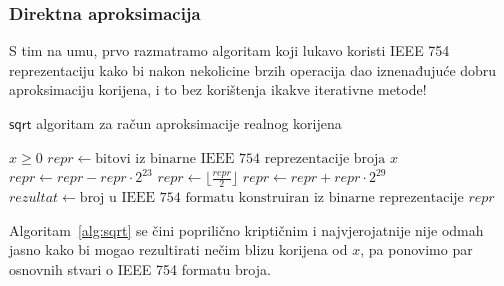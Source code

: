 \documentclass[12pt]{scrartcl}
\begin{document}
\subsubsection{Direktna aproksimacija }
S tim na umu, prvo razmatramo algoritam koji lukavo koristi IEEE 754 reprezentaciju kako bi nakon nekolicine brzih operacija dao iznenađujuće
dobru aproksimaciju korijena, i to bez korištenja ikakve iterativne metode!
\begin{algorithm}
    \caption{$\mathsf{sqrt}$ algoritam za račun aproksimacije realnog korijena~\cite{lomont}}\label{alg:sqrt}
    \begin{algorithmic}[1]
    \Require $x \geq 0$
    \State $repr \gets \text{bitovi iz binarne IEEE 754 reprezentacije broja $x$}$
    \State $repr \gets repr - repr \cdot 2^{23}$
    \State $repr \gets \lfloor\frac{repr}{2}\rfloor$
    \State $repr \gets repr + repr \cdot 2^{29}$
    \State $rezultat \gets \text{broj u IEEE 754 formatu konstruiran iz binarne reprezentacije $repr$}$
    \end{algorithmic}
\end{algorithm}
Algoritam~\ref{alg:sqrt} se čini poprilično kriptičnim i najvjerojatnije nije odmah jasno kako bi mogao rezultirati nečim blizu korijena od $x$, pa
ponovimo par osnovnih stvari o IEEE 754 formatu broja.
\begin{figure}[h]
\end{figure}
\end{document}
